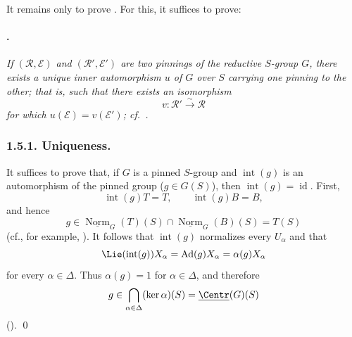 It remains only to prove . For this, it suffices to prove:

\paragraph{.}
\emph{If \((\mathscr R,\mathcal E)\) and
\((\mathscr R',\mathcal E')\) are two pinnings of the reductive
\(S\)-group \(G\), there exists a unique inner automorphism \(u\) of
\(G\) over \(S\) carrying one pinning to the other; that is, such that
there exists an isomorphism
\[
  v:\mathscr R'\xrightarrow{\sim}\mathscr R
\]
for which \(u(\mathcal E)=v(\mathcal E')\); cf.\ .}

\subsubsection*{1.5.1. Uniqueness.}
It suffices to prove that, if \(G\) is a pinned \(S\)-group and
\(\operatorname{int}(g)\) is an automorphism of the pinned group
\textup{(\(g\in G(S)\))}, then \(\operatorname{int}(g)=\operatorname{id}\).
First,
\[
  \operatorname{int}(g)T=T,\qquad
  \operatorname{int}(g)B=B,
\]
and hence
\[
  g\in
  \underline{\operatorname{Norm}}_G(T)(S)
  \cap\underline{\operatorname{Norm}}_G(B)(S)
  =T(S)
\]
\textup{(cf., for example, )}. It follows that
\(\operatorname{int}(g)\) normalizes every \(U_\alpha\) and that
\[
  \Lie(\operatorname{int}(g))X_\alpha
  =\operatorname{Ad}(g)X_\alpha
  =\alpha(g)X_\alpha
\]
for every \(\alpha\in\Delta\). Thus \(\alpha(g)=1\) for
\(\alpha\in\Delta\), and therefore
\[
  g\in
  \bigcap_{\alpha\in\Delta}(\ker\alpha)(S)
  =\underline{\Centr}(G)(S)
\]
\textup{()}. \qed




